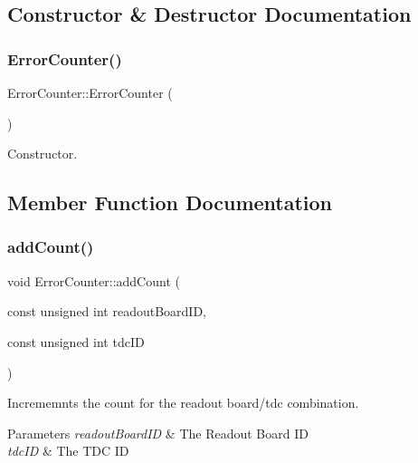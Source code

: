 \subsection{Constructor \& Destructor Documentation}
\mbox{\label{class_error_counter_a95facfc3369d4cf69b255519c579912e}} 
\subsubsection{\texorpdfstring{Error\+Counter()}{ErrorCounter()}}
{\footnotesize\ttfamily Error\+Counter\+::\+Error\+Counter (\begin{DoxyParamCaption}{ }\end{DoxyParamCaption})}



Constructor. 



\subsection{Member Function Documentation}
\mbox{\label{class_error_counter_a6ef83e5c7eccd70772881294a8dc714b}} 
\subsubsection{\texorpdfstring{add\+Count()}{addCount()}}
{\footnotesize\ttfamily void Error\+Counter\+::add\+Count (\begin{DoxyParamCaption}\item[{const unsigned int}]{readout\+Board\+ID,  }\item[{const unsigned int}]{tdc\+ID }\end{DoxyParamCaption})\hspace{0.3cm}{\ttfamily [inline]}}



Incrememnts the count for the readout board/tdc combination. 


\begin{DoxyParams}{Parameters}
{\em readout\+Board\+ID} & The Readout Board ID \\
\hline
{\em tdc\+ID} & The T\+DC ID \\
\hline
\end{DoxyParams}
\mbox{\label{class_error_counter_affc256e518dc91811a48fd5ba42de8cd}} 

